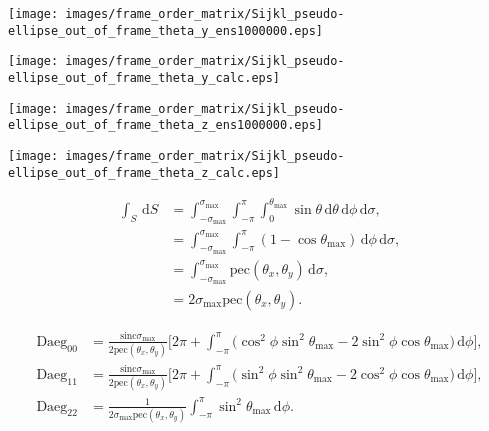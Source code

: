 \documentclass[a4paper,11pt,twoside,openright]{book}
\providecommand{\pec}{{\mathrm{pec}}}%
\providecommand{\sinc}{{\mathrm{sinc}}}%
\def\lthtmlcheckvsize{\ifdim\ht\sizebox<\vsize 
  \ifdim\wd\sizebox<\hsize\expandafter\hfill\fi \expandafter\vfill
  \else\expandafter\vss\fi}%
\begin{document}
{\newpage\clearpage
{}%
\texttt{[image: images/frame\_order\_matrix/Sijkl\_pseudo-ellipse\_out\_of\_frame\_theta\_y\_ens1000000.eps]}%
\lthtmlpictureZ
\lthtmlcheckvsize\clearpage}

{\newpage\clearpage
{}%
\texttt{[image: images/frame\_order\_matrix/Sijkl\_pseudo-ellipse\_out\_of\_frame\_theta\_y\_calc.eps]}%
\lthtmlpictureZ
\lthtmlcheckvsize\clearpage}

{\newpage\clearpage
{}%
\texttt{[image: images/frame\_order\_matrix/Sijkl\_pseudo-ellipse\_out\_of\_frame\_theta\_z\_ens1000000.eps]}%
\lthtmlpictureZ
\lthtmlcheckvsize\clearpage}

{\newpage\clearpage
{}%
\texttt{[image: images/frame\_order\_matrix/Sijkl\_pseudo-ellipse\_out\_of\_frame\_theta\_z\_calc.eps]}%
\lthtmlpictureZ
\lthtmlcheckvsize\clearpage}

{\newpage\clearpage
\setcounter{equation}{50}
%
\begin{subequations}\begin{align}
\int_S \,\mathrm{d}S &= \int_{-\sigma_{\textrm{max}}}^{\sigma_{\textrm{max}}} \int_{-\pi}^{\pi} \int_{0}^{\theta_{\textrm{max}}} \sin\theta \,\mathrm{d}\theta \,\mathrm{d}\phi \,\mathrm{d}\sigma , \\
&= \int_{-\sigma_{\textrm{max}}}^{\sigma_{\textrm{max}}} \int_{-\pi}^{\pi} \left( 1 - \cos\theta_{\textrm{max}}\right) \,\mathrm{d}\phi \,\mathrm{d}\sigma ,\\
&= \int_{-\sigma_{\textrm{max}}}^{\sigma_{\textrm{max}}} \pec (\theta_x , \theta_y ) \,\mathrm{d}\sigma , \\
&= 2\sigma_{\textrm{max}}\pec (\theta_x , \theta_y ) .
\end{align}\end{subequations}%
\lthtmldisplayZ
\lthtmlcheckvsize\clearpage}

{\newpage\clearpage
\setcounter{equation}{51}
%
\begin{subequations}\begin{align}
\textrm{Daeg}_{00} &= \frac{\sinc \sigma_{\textrm{max}}}{2\pec (\theta_x , \theta_y )} \Bigg[
2\pi +
\int_{-\pi}^{\pi}
\Big( \cos^2\phi \sin^2\theta_{\textrm{max}}- 2\sin^2\phi \cos\theta_{\textrm{max}}\Big)
\,\mathrm{d}\phi
\Bigg] , \\
\textrm{Daeg}_{11} &= \frac{\sinc \sigma_{\textrm{max}}}{2\pec (\theta_x , \theta_y )} \Bigg[
2\pi +
\int_{-\pi}^{\pi}
\Big( \sin^2\phi \sin^2\theta_{\textrm{max}}- 2\cos^2\phi \cos\theta_{\textrm{max}}\Big)
\,\mathrm{d}\phi
\Bigg] , \\
\textrm{Daeg}_{22} &= \frac{1}{2\sigma_{\textrm{max}}\pec (\theta_x , \theta_y )}
\int_{-\pi}^{\pi}
\sin^2\theta_{\textrm{max}}
\,\mathrm{d}\phi .
\end{align}\end{subequations}%
\lthtmldisplayZ
\lthtmlcheckvsize\clearpage}
\end{document}
